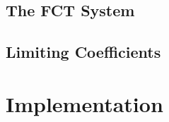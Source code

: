 \subsection{The FCT System}
  
\subsection{Limiting Coefficients\label{sec:limiting_coefficients}}
  
  
  
  
\section{Implementation}  
